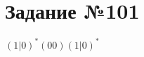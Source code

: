\documentclass[12pt]{article}
\begin{document}
\section{Задание №101}
$(1|0)^{*}(00)(1|0)^{*}$
\end{document}
